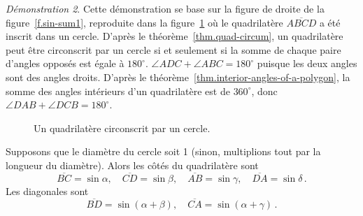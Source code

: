 \noindent \emph{Démonstration 2}. 
Cette démonstration se base sur la figure  de droite de la figure~\ref{f.sin-sum1},  reproduite dans la figure~\ref{f.trig-quad-circle} où le quadrilatère $\overline{ABCD}$ a été inscrit dans un cercle. D'après le théorème~\ref{thm.quad-circum}, un quadrilatère peut être circonscrit par un cercle si et seulement si la somme de chaque paire d'angles opposés est égale à $180^\circ$.
$\angle ADC+\angle ABC=180^\circ$ puisque les deux angles sont des angles droits. D'après le théorème~\ref{thm.interior-angles-of-a-polygon}, la somme des angles intérieurs d'un quadrilatère est de $360^\circ$, donc $\angle DAB+\angle DCB=180^\circ$. 
\begin{figure}[htbp]
\centering

\caption{Un quadrilatère circonscrit par un cercle.}\label{f.trig-quad-circle}
\end{figure}

Supposons que le diamètre du cercle soit 1 (sinon, multiplions tout par la longueur du diamètre). Alors les côtés du quadrilatère sont 
\[
\overline{BC}=\sin\alpha,\quad \overline{CD}=\sin\beta,\quad \overline{AB}=\sin\gamma,\quad \overline{DA}=\sin\delta\,.
\]
Les diagonales sont 
\[
\overline{BD}=\sin(\alpha + \beta),\quad \overline{CA}=\sin (\alpha+\gamma)\,.
\]

